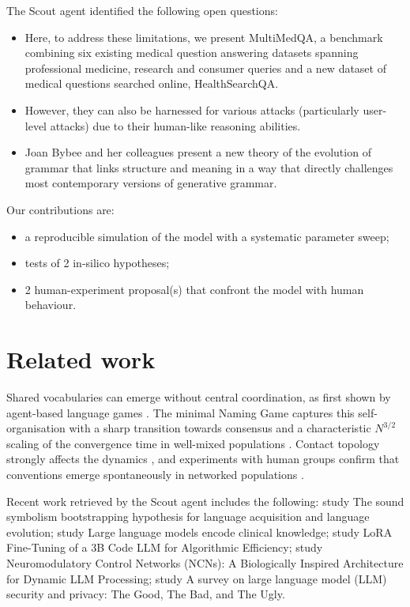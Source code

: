\documentclass[11pt,a4paper]{article}
\begin{document}
The Scout agent identified the following open questions:
\begin{itemize}
  \item Here, to address these limitations, we present MultiMedQA, a benchmark combining six existing medical question answering datasets spanning professional medicine, research and consumer queries and a new dataset of medical questions searched online, HealthSearchQA.
  \item However, they can also be harnessed for various attacks (particularly user-level attacks) due to their human-like reasoning abilities.
  \item Joan Bybee and her colleagues present a new theory of the evolution of grammar that links structure and meaning in a way that directly challenges most contemporary versions of generative grammar.
\end{itemize}

Our contributions are:
\begin{itemize}
  \item a reproducible simulation of the model with a systematic parameter sweep;
  \item tests of 2 in-silico hypotheses;
  \item 2 human-experiment proposal(s) that confront the model with human behaviour.
\end{itemize}

\section{Related work}
Shared vocabularies can emerge without central coordination, as first shown by agent-based language games \citep{steels1995selforganizing}. The minimal Naming Game captures this self-organisation with a sharp transition towards consensus and a characteristic $N^{3/2}$ scaling of the convergence time in well-mixed populations \citep{baronchelli2006sharp}. Contact topology strongly affects the dynamics \citep{dallasta2006nonequilibrium}, and experiments with human groups confirm that conventions emerge spontaneously in networked populations \citep{centola2015spontaneous}.

Recent work retrieved by the Scout agent includes the following: \citet{imai2014sound} study The sound symbolism bootstrapping hypothesis for language acquisition and language evolution; \citet{singhal2023large} study Large language models encode clinical knowledge; \citet{hu2021lora} study LoRA Fine-Tuning of a 3B Code LLM for Algorithmic Efficiency; \citet{christian2025neuromodulatory} study Neuromodulatory Control Networks (NCNs): A Biologically Inspired Architecture for Dynamic LLM Processing; \citet{yao2024survey} study A survey on large language model (LLM) security and privacy: The Good, The Bad, and The Ugly.
\end{document}
